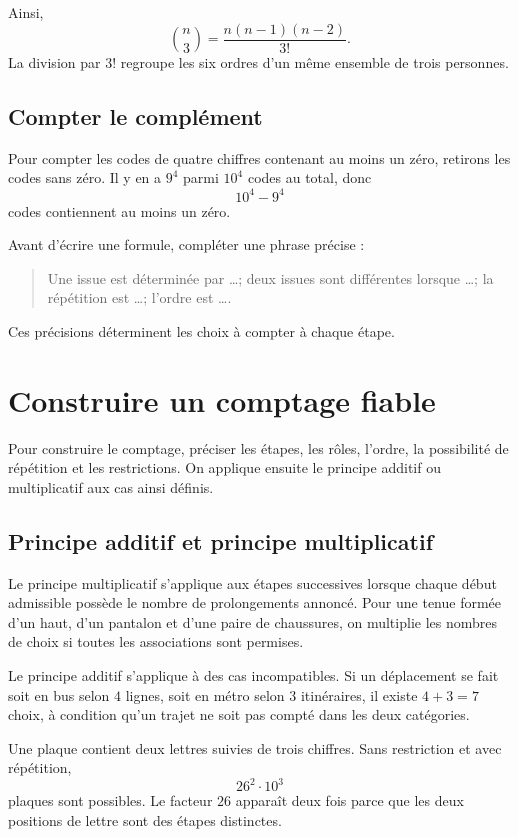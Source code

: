 Ainsi,
\[
\binom n3=\frac{n(n-1)(n-2)}{3!}.
\]
La division par $3!$ regroupe les six ordres d'un même ensemble de trois personnes.

\subsection{Compter le complément}
Pour compter les codes de quatre chiffres contenant au moins un zéro, retirons les codes sans zéro. Il y en a $9^4$ parmi $10^4$ codes au total, donc
\[
10^4-9^4
\]
codes contiennent au moins un zéro.

\begin{visualbox}
Avant d'écrire une formule, compléter une phrase précise :
\begin{quote}
Une issue est déterminée par \dots; deux issues sont différentes lorsque \dots; la répétition est \dots; l'ordre est \dots.
\end{quote}
Ces précisions déterminent les choix à compter à chaque étape.
\end{visualbox}


\section{Construire un comptage fiable}
\label{manual:section:07.09}

Pour construire le comptage, préciser les étapes, les rôles, l'ordre, la possibilité de répétition et les restrictions. On applique ensuite le principe additif ou multiplicatif aux cas ainsi définis.

\subsection{Principe additif et principe multiplicatif}

Le principe multiplicatif s'applique aux étapes successives lorsque chaque début admissible possède le nombre de prolongements annoncé. Pour une tenue formée d'un haut, d'un pantalon et d'une paire de chaussures, on multiplie les nombres de choix si toutes les associations sont permises.

Le principe additif s'applique à des cas incompatibles. Si un déplacement se fait soit en bus selon $4$ lignes, soit en métro selon $3$ itinéraires, il existe $4+3=7$ choix, à condition qu'un trajet ne soit pas compté dans les deux catégories.

\begin{examplebox}
Une plaque contient deux lettres suivies de trois chiffres. Sans restriction et avec répétition,
\[
26^2\cdot10^3
\]
plaques sont possibles. Le facteur $26$ apparaît deux fois parce que les deux positions de lettre sont des étapes distinctes.
\end{examplebox}

